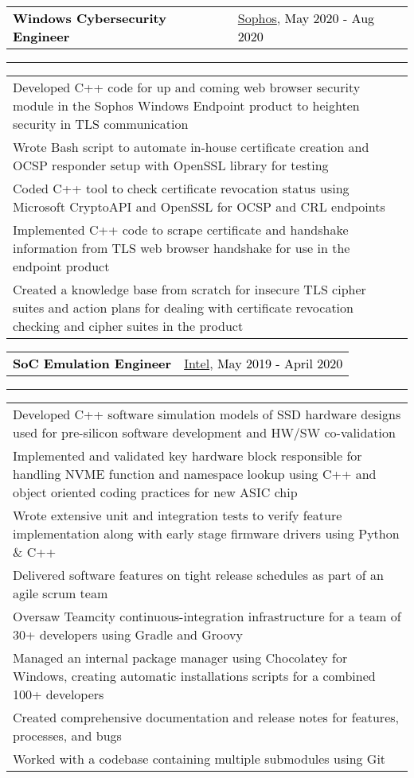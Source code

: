 \documentclass[10pt,letterpaper]{article}
\newcommand{\mpwidth}{\linewidth-\fboxsep-\fboxsep}
\newcommand{\tzlarrow}{(0,0) -- (0.2,0) -- (0.3,0.2) -- (0.2,0.4) -- (0,0.4) -- (0.1,0.2) -- cycle;}
\newcommand{\larrow}[1]
{\begin{tikzpicture}[scale=0.58]
	 \filldraw[fill=#1!100,draw=#1!100!black]  \tzlarrow
 \end{tikzpicture}
}
\newcommand{\cvbigevent}[8]
{
\vspace{8pt}
	\begin{tabular*}{0.2\mpwidth}{p{0.4\mpwidth}  x{0.575\mpwidth}}
 	\textcolor{black}{\textbf{#2}} & \textcolor{complcol}{#3}, \textcolor{black}{#1} 

	\end{tabular*}
\vspace{-12pt}
\textcolor{softcol}{\hrule}
\vspace{6pt}
	\begin{tabular*}{0.5\mpwidth}{p{\mpwidth}}
\larrow{softcol}  #4\\[6pt]
\larrow{softcol}  #5\\[6pt]
\larrow{softcol}  #6\\[6pt]
\larrow{softcol}  #7\\[6pt]
\larrow{softcol}  #8\\[6pt]
	\end{tabular*}

}
\newcommand{\cvIntelEvent}[9]
{
\vspace{8pt}
	\begin{tabular*}{0.2\mpwidth}{p{0.4\mpwidth}  x{0.575\mpwidth}}
 	\textcolor{black}{\textbf{#2}} & \textcolor{complcol}{#3}, \textcolor{black}{#1} 

	\end{tabular*}
\vspace{-12pt}
\textcolor{softcol}{\hrule}
\vspace{6pt}
	\begin{tabular*}{0.5\mpwidth}{p{\mpwidth}}
\larrow{softcol}  #4 \\[6pt]
\larrow{softcol}  #5 \\[6pt]
\larrow{softcol}  #6 \\[6pt]
\larrow{softcol}  #7 \\[6pt]
\larrow{softcol}  #8 \\[6pt]
\larrow{softcol}  #9 \\[6pt]
\larrow{softcol} Created comprehensive documentation and release notes for features, processes, and bugs \\[6pt]
\larrow{softcol} Worked with a codebase containing multiple submodules using Git \\[6pt]

	\end{tabular*}

}
\begin{document}
{\begin{minipage}[c][0.95\textheight][t]{0.69\linewidth}
\cvbigevent{May 2020 - Aug 2020}{Windows Cybersecurity Engineer}{\href{https://www.sophos.com/en-us.aspx}{Sophos}}{Developed C++ code for up and coming web browser security module in the Sophos Windows Endpoint product to heighten security in TLS communication}{ Wrote Bash script to automate in-house certificate creation and OCSP responder setup with OpenSSL library for testing}{Coded C++ tool to check certificate revocation status using Microsoft CryptoAPI and OpenSSL for OCSP and CRL endpoints}{Implemented C++ code to scrape certificate and handshake information from TLS web browser handshake for use in the endpoint product}{Created a knowledge base from scratch for insecure TLS cipher suites and action plans for dealing with certificate revocation checking and cipher suites in the product}
\cvIntelEvent{May 2019 - April 2020}{SoC Emulation Engineer}{\href{http://www.intel.com}{Intel}}{Developed C++ software simulation models of SSD hardware designs used for pre-silicon software development and HW/SW co-validation}{Implemented and validated key hardware block responsible for handling NVME function and namespace lookup using C++ and object oriented coding practices for new ASIC chip}{Wrote extensive unit and integration tests to verify feature implementation along with early stage firmware drivers using Python \& C++}{Delivered software features on tight release schedules as part of an agile scrum team}{Oversaw Teamcity continuous-integration infrastructure for a team of 30+ developers using Gradle and Groovy}{Managed an internal package manager using Chocolatey for Windows, creating automatic installations scripts for a combined 100+ developers}


\end{minipage}}
\end{document}
